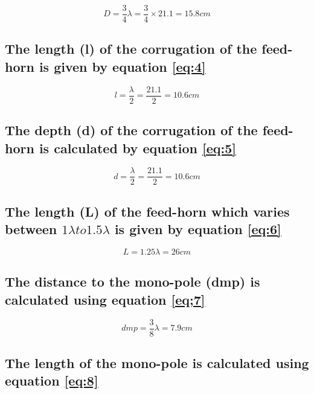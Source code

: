 {\begin{equation}
D =\frac{3}{4} \lambda = \frac{3}{4} \times 21.1 = 15.8cm
\label{eq:3}
\end{equation}

\subsection{The length (l) of the corrugation of the feed-horn is given by equation \ref{eq:4}}
    
\begin{equation}
  l = \frac{\lambda}{2} = \frac{21.1}{2} = 10.6 cm
\label{eq:4}
\end{equation}



\subsection{The depth (d) of the corrugation of the feed-horn is calculated by equation \ref{eq:5}}

\begin{equation}
    d=\frac{\lambda}{2} = \frac{21.1}{2} = 10.6 cm 
\label{eq:5}
\end{equation}

\subsection{The length (L) of the feed-horn which varies between \(1 \lambda to 1.5 \lambda\) is given by equation \ref{eq:6}}

\begin{equation}
    L= 1.25 \lambda = 26 cm
    \label{eq:6}
\end{equation}

\subsection{The  distance to the mono-pole (dmp) is calculated using equation \ref{eq;7}}

\begin{equation}
    dmp=\frac{3}{8} \lambda = 7.9 cm
    \label{eq;7}
\end{equation}


\subsection{The  length of the mono-pole is calculated using equation \ref{eq:8}}


}
